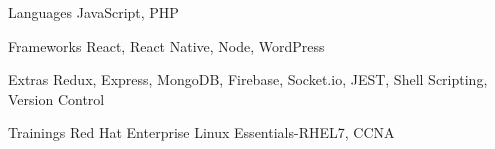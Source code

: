 
\begin{cvskills}
  \cvskill
    {Languages} %
    {JavaScript, PHP} %

  \cvskill
    {Frameworks} %
    {React, React Native, Node, WordPress} %
    
   \cvskill
    {Extras} %
    {Redux, Express, MongoDB, Firebase, Socket.io, JEST, Shell Scripting, Version Control} %
    
    \cvskill
    {Trainings} %
    { Red Hat Enterprise Linux Essentials-RHEL7, CCNA  }
\end{cvskills}
